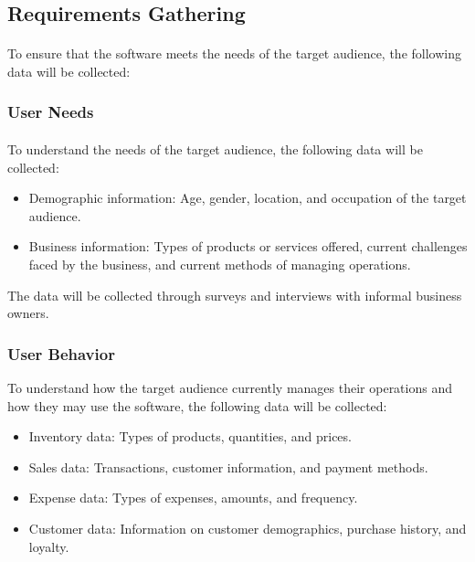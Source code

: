 \documentclass{article}
\begin{document}
\subsection{Requirements Gathering}

\paragraph*{}
To ensure that the software meets the needs of the target audience, the following data will be collected:

\subsubsection{User Needs}
\paragraph*{}
To understand the needs of the target audience, the following data will be collected:

\begin{itemize}
    \item Demographic information: Age, gender, location, and occupation of the target audience.
    \item Business information: Types of products or services offered, current challenges faced by the business, and current methods of managing operations.
\end{itemize}

The data will be collected through surveys and interviews with informal business owners.

\subsubsection{User Behavior}
To understand how the target audience currently manages their operations and how they may use the software, the following data will be collected:

\begin{itemize}
    \item Inventory data: Types of products, quantities, and prices.
    \item Sales data: Transactions, customer information, and payment methods.
    \item Expense data: Types of expenses, amounts, and frequency.
    \item Customer data: Information on customer demographics, purchase history, and loyalty.
\end{itemize}
\end{document}
